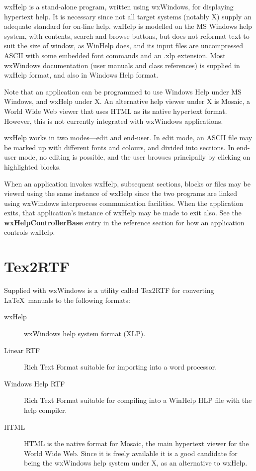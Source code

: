 wxHelp is a stand-alone program, written using wxWindows,
for displaying hypertext help. It is necessary since not all target
systems (notably X) supply an adequate
standard for on-line help. wxHelp is modelled on the MS Windows help
system, with contents, search and browse buttons, but does not reformat
text to suit the size of window, as WinHelp does, and its input files
are uncompressed ASCII with some embedded font commands and an .xlp
extension. Most wxWindows documentation (user manuals and class
references) is supplied in wxHelp format, and also in Windows Help
format.

Note that an application can be programmed to use Windows Help under
MS Windows, and wxHelp under X. An alternative help viewer under X is
Mosaic, a World Wide Web viewer that uses HTML as its native hypertext
format. However, this is not currently integrated with wxWindows
applications.

wxHelp works in two modes---edit and end-user. In edit mode, an ASCII
file may be marked up with different fonts and colours, and divided into
sections. In end-user mode, no editing is possible, and the user browses
principally by clicking on highlighted blocks.

When an application invokes wxHelp, subsequent sections, blocks or
files may be viewed using the same instance of wxHelp since the two
programs are linked using wxWindows interprocess communication
facilities. When the application exits, that application's instance of
wxHelp may be made to exit also.  See the {\bf wxHelpControllerBase} entry in the
reference section for how an application controls wxHelp.

\section{Tex2RTF}\label{textortf}

Supplied with wxWindows is a utility called Tex2RTF for converting\rtfsp
\LaTeX\ manuals to the following formats:

\begin{description}
\item[wxHelp]
wxWindows help system format (XLP).
\item[Linear RTF]
Rich Text Format suitable for importing into a word processor.
\item[Windows Help RTF]
Rich Text Format suitable for compiling into a WinHelp HLP file with the
help compiler.
\item[HTML]
HTML is the native format for Mosaic, the main hypertext viewer for
the World Wide Web. Since it is freely available it is a good candidate
for being the wxWindows help system under X, as an alternative to wxHelp.
\end{description}

